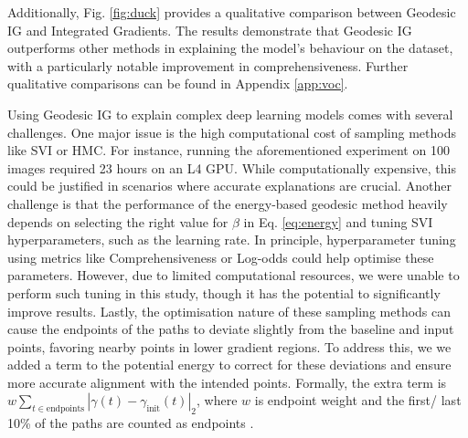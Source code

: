 Additionally, Fig. \ref{fig:duck} provides a qualitative comparison between Geodesic IG and Integrated Gradients. The results demonstrate that Geodesic IG outperforms other methods in explaining the model's behaviour on the dataset, with a particularly notable improvement in comprehensiveness. Further qualitative comparisons can be found in Appendix \ref{app:voc}.

Using Geodesic IG to explain complex deep learning models comes with several challenges. One major issue is the high computational cost of sampling methods like SVI or HMC. For instance, running the aforementioned experiment on 100 images required 23 hours on an L4 GPU. While computationally expensive, this could be justified in scenarios where accurate explanations are crucial. Another challenge is that the performance of the energy-based geodesic method heavily depends on selecting the right value for $\beta$ in Eq. \ref{eq:energy} and tuning SVI hyperparameters, such as the learning rate. In principle, hyperparameter tuning using metrics like Comprehensiveness or Log-odds could help optimise these parameters. However, due to limited computational resources, we were unable to perform such tuning in this study, though it has the potential to significantly improve results. Lastly, the optimisation nature of these sampling methods can cause the endpoints of the paths to deviate slightly from the baseline and input points, favoring nearby points in lower gradient regions. To address this, we we added a term to the potential energy to correct for these deviations and ensure more accurate alignment with the intended points.  Formally, the extra term is $w \sum_{t \in \text{endpoints}} |\gamma(t) - \gamma_{\text{init}}(t)|_2$, where $w$ is endpoint weight and the first/ last 10\% of the paths are counted as endpoints .